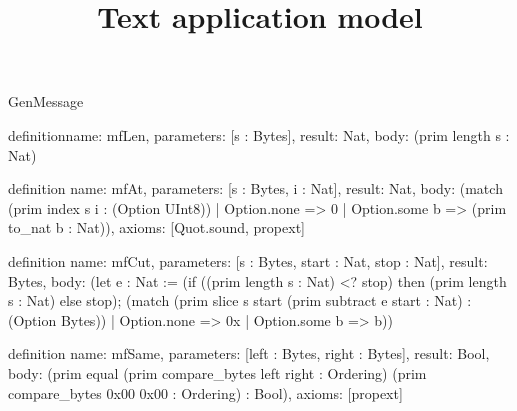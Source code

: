 \begin{lexlean}{GenMessage}
\title{Text application model}
\begin{semanticmodule}
definition{name: mfLen, parameters: [s : Bytes], result: Nat, body: (prim length s : Nat)}

definition{
  name: mfAt,
  parameters: [s : Bytes, i : Nat],
  result: Nat,
  body: (match (prim index s i : (Option UInt8))
    | Option.none => 0
    | Option.some b => (prim to_nat b : Nat)),
  axioms: [Quot.sound, propext]
}

definition{
  name: mfCut,
  parameters: [s : Bytes, start : Nat, stop : Nat],
  result: Bytes,
  body: (let e : Nat := (if ((prim length s : Nat) <? stop) then (prim length s : Nat) else stop); (match (prim slice s start (prim subtract e start : Nat) : (Option Bytes))
    | Option.none => 0x
    | Option.some b => b))
}

definition{
  name: mfSame,
  parameters: [left : Bytes, right : Bytes],
  result: Bool,
  body: (prim equal (prim compare_bytes left right : Ordering) (prim compare_bytes 0x00 0x00 : Ordering) : Bool),
  axioms: [propext]
}


\end{semanticmodule}
\end{lexlean}

